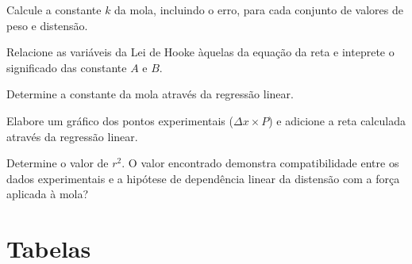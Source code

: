 \begin{question}[type={exam}]{1.5} 
Calcule a constante $k$ da mola, incluindo o erro, para cada conjunto de valores de peso e distensão.
\end{question}

\begin{question}[type={exam}]{1} 
Relacione as variáveis da Lei de Hooke àquelas da equação da reta e inteprete o significado das constante $A$ e $B$.
\end{question}

\begin{question}[type={exam}]{2} 
Determine a constante da mola através da regressão linear.
\end{question}

\begin{question}[type={exam}]{3} 
Elabore um gráfico dos pontos experimentais ($\Delta x \times P$) e adicione a reta calculada através da regressão linear.
\end{question}

\begin{question}[type={exam}]{1} 
Determine o valor de $r^2$. O valor encontrado demonstra compatibilidade entre os dados experimentais e a hipótese de dependência linear da distensão com a força aplicada à mola?
\end{question}
\vfill

\pagebreak
\section{Tabelas}

